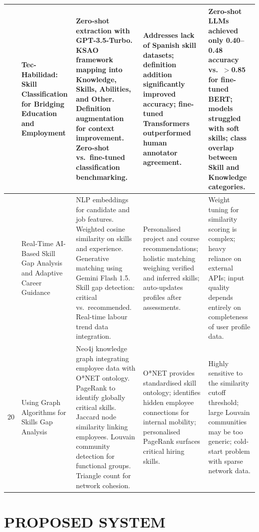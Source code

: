 \documentclass[12pt,a4paper]{report}
\begin{document}
\begin{longtable}{|>{\centering\arraybackslash}p{0.6cm}|p{3.1cm}|p{3.6cm}|p{3.2cm}|p{3.2cm}|}
18 & Tec-Habilidad: Skill Classification for Bridging Education and Employment \cite{ref18} &
Zero-shot extraction with GPT-3.5-Turbo. KSAO framework mapping into Knowledge, Skills, Abilities, and Other. Definition augmentation for context improvement. Zero-shot vs.\ fine-tuned classification benchmarking. &
Addresses lack of Spanish skill datasets; definition addition significantly improved accuracy; fine-tuned Transformers outperformed human annotator agreement. &
Zero-shot LLMs achieved only 0.40--0.48 accuracy vs.\ $>$0.85 for fine-tuned BERT; models struggled with soft skills; class overlap between Skill and Knowledge categories. \\
\hline

19 & Real-Time AI-Based Skill Gap Analysis and Adaptive Career Guidance \cite{ref19} &
NLP embeddings for candidate and job features. Weighted cosine similarity on skills and experience. Generative matching using Gemini Flash 1.5. Skill gap detection: critical vs.\ recommended. Real-time labour trend data integration. &
Personalised project and course recommendations; holistic matching weighing verified and inferred skills; auto-updates profiles after assessments. &
Weight tuning for similarity scoring is complex; heavy reliance on external APIs; input quality depends entirely on completeness of user profile data. \\
\hline

20 & Using Graph Algorithms for Skills Gap Analysis \cite{ref20} &
Neo4j knowledge graph integrating employee data with O*NET ontology. PageRank to identify globally critical skills. Jaccard node similarity linking employees. Louvain community detection for functional groups. Triangle count for network cohesion. &
O*NET provides standardised skill ontology; identifies hidden employee connections for internal mobility; personalised PageRank surfaces critical hiring skills. &
Highly sensitive to the similarity cutoff threshold; large Louvain communities may be too generic; cold-start problem with sparse network data. \\
\hline

\end{longtable}
\endgroup

\chapter{PROPOSED SYSTEM}
\end{document}
